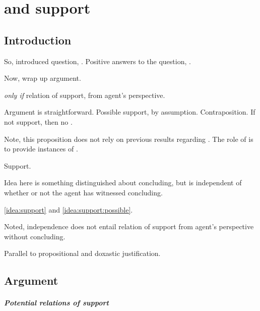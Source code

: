 \chapter{ and support}
\label{cha:fcs}

\section{Introduction}
\label{cha:fcs:sec:introduction}

\begin{note}
  So, introduced question, \qzS{}.
  Positive answers to the question, .

  Now, wrap up argument.

  \begin{proposition}
    \label{prop:fcs-only-if-support}
     \emph{only if} relation of support, from agent's perspective.
  \end{proposition}

  Argument is straightforward.
  Possible support, by assumption.
  Contraposition.
  If not support, then no \fc{}.

  Note, this proposition does not rely on previous results regarding \qzS{}.
  The role of \qzS{} is to provide instances of .
\end{note}

\begin{note}
  Support.

  Idea here is something distinguished about concluding, but is independent of whether or not the agent has witnessed concluding.

  \autoref{idea:support} and \autoref{idea:support:possible}.

  Noted, independence does not entail relation of support from agent's perspective without concluding.

  Parallel to propositional and doxastic justification.
\end{note}

\section{Argument}
\label{cha:fcs:sec:argument}

\paragraph{Potential relations of support}

